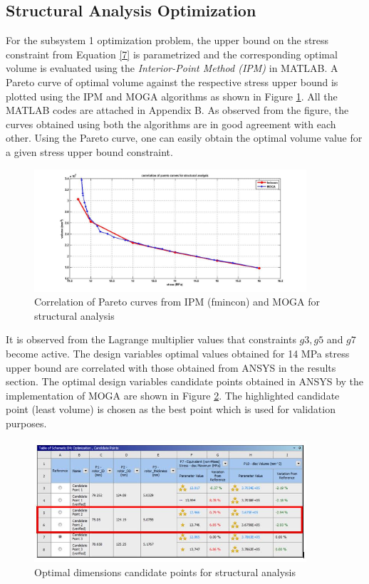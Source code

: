 \documentclass[12pt]{article}
\begin{document}
\subsection{Structural Analysis Optimization}
For the subsystem 1 optimization problem, the upper bound on the stress constraint from Equation \ref{7} is parametrized and the corresponding optimal volume is evaluated using the \emph{Interior-Point Method (IPM)} in MATLAB. A Pareto curve of optimal volume against the respective stress upper bound is plotted using the IPM and MOGA algorithms as shown in Figure \ref{fig2}. All the MATLAB codes are attached in Appendix B. As observed from the figure, the curves obtained using both the algorithms are in good agreement with each other. Using the Pareto curve, one can easily obtain the optimal volume value for a given stress upper bound constraint. 
\begin{figure}[H]
\begin{center}
\includegraphics[width=0.9\textwidth]{structural_pareto.jpg}
\caption{Correlation of Pareto curves from IPM (fmincon) and MOGA for structural analysis}
\label{fig2}
\end{center}
\end{figure}
It is observed from the Lagrange multiplier values that constraints $g3, g5$ and $g7$ become active. The design variables optimal values obtained for 14 MPa stress upper bound are correlated with those obtained from ANSYS in the results section. The optimal design variables candidate points obtained in ANSYS by the implementation of MOGA are shown in Figure \ref{cs}. The highlighted candidate point (least volume) is chosen as the best point which is used for validation purposes.
\begin{figure}
\begin{center}
\includegraphics[width=0.9\textwidth]{cs.jpg}
\caption{Optimal dimensions candidate points for structural analysis}
\label{cs}
\end{center}
\end{figure}
\end{document}
